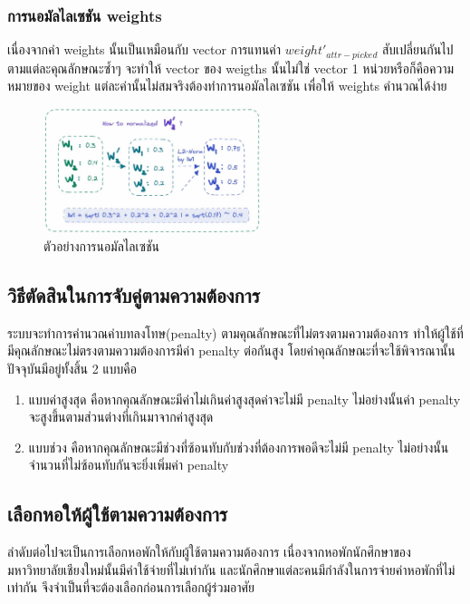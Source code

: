 \subsubsection{การนอมัลไลเซชัน weights} 
เนื่องจากค่า weights นั้นเป็นเหมือนกับ vector การแทนค่า $weight'_{attr-picked}$ สับเปลี่ยนกันไปตามแต่ละคุณลักษณะซ้ำๆ 
จะทำให้ vector ของ weigths นั้นไม่ใช่ vector 1 หน่วยหรือก็คือความหมายของ weight แต่ละค่านั้นไม่สมจริงต้องทำการนอมัลไลเซชัน
เพื่อให้ weights คำนวณได้ง่าย

\begin{figure}[ht]
  \begin{center}
    \includegraphics[width=2.5in]{photo/diagram/weight_norm.jpeg}
  \end{center}
  \caption{ตัวอย่างการนอมัลไลเซชัน}
  \label{fig:weight-norm}
\end{figure}

\subsection{วิธีตัดสินในการจับคู่ตามความต้องการ}
ระบบจะทำการคำนวณค่าบทลงโทษ(penalty) ตามคุณลักษณะที่ไม่ตรงตามความต้องการ ทำให้ผู้ใช้ที่มีคุณลักษณะไม่ตรงตามความต้องการมีค่า penalty ต่อกันสูง
โดยค่าคุณลักษณะที่จะใช้พิจารณานั้นปัจจุบันมีอยู่ทั้งสิ้น 2 แบบคือ
\begin{enumerate}
  \item แบบค่าสูงสุด คือหากคุณลักษณะมีค่าไม่เกินค่าสูงสุดค่าจะไม่มี penalty ไม่อย่างนั้นค่า penalty จะสูงขึ้นตามส่วนต่างที่เกินมาจากค่าสูงสุด
  \item แบบช่วง คือหากคุณลักษณะมีช่วงที่ซ้อนทับกับช่วงที่ต้องการพอดีจะไม่มี penalty ไม่อย่างนั้นจำนวนที่ไม่ซ้อนทับกันจะยิ่งเพิ่มค่า penalty
\end{enumerate}

\subsection{เลือกหอให้ผู้ใช้ตามความต้องการ}
ลำดับต่อไปจะเป็นการเลือกหอพักให้กับผู้ใช้ตามความต้องการ เนื่องจากหอพักนักศึกษาของมหาวิทยาลัยเชียงใหม่นั้นมีค่าใช้จ่ายที่ไม่เท่ากัน
และนักศึกษาแต่ละคนมีกำลังในการจ่ายค่าหอพักที่ไม่เท่ากัน จึงจำเป็นที่จะต้องเลือกก่อนการเลือกผู้ร่วมอาศัย 

